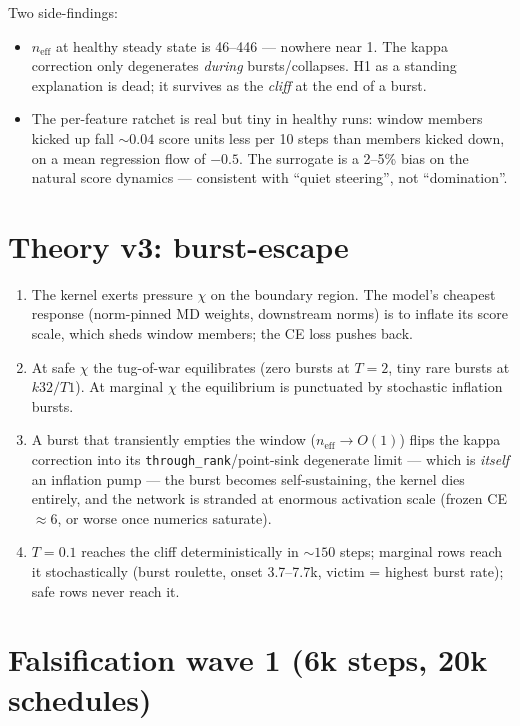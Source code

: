 \documentclass[11pt,a4paper]{article}
\newcommand{\code}[1]{\texttt{#1}}
\newcommand{\neff}{n_{\mathrm{eff}}}
\begin{document}
Two side-findings:
\begin{itemize}[leftmargin=1.4em]
\item $\neff$ at healthy steady state is 46--446 --- nowhere near 1. The kappa
  correction only degenerates \emph{during} bursts/collapses. H1 as a standing
  explanation is dead; it survives as the \emph{cliff} at the end of a burst.
\item The per-feature ratchet is real but tiny in healthy runs: window members
  kicked up fall ${\sim}0.04$ score units less per 10 steps than members
  kicked down, on a mean regression flow of $-0.5$. The surrogate is a
  2--5\% bias on the natural score dynamics --- consistent with ``quiet
  steering'', not ``domination''.
\end{itemize}

\section{Theory v3: burst-escape}

\begin{enumerate}[leftmargin=1.6em]
\item The kernel exerts pressure $\chi$ on the boundary region. The model's
  cheapest response (norm-pinned MD weights, downstream norms) is to inflate
  its score scale, which sheds window members; the CE loss pushes back.
\item At safe $\chi$ the tug-of-war equilibrates (zero bursts at $T{=}2$, tiny
  rare bursts at $k32/T1$). At marginal $\chi$ the equilibrium is punctuated
  by stochastic inflation bursts.
\item A burst that transiently empties the window ($\neff \to O(1)$) flips the
  kappa correction into its \code{through\_rank}/point-sink degenerate limit
  --- which is \emph{itself} an inflation pump --- the burst becomes
  self-sustaining, the kernel dies entirely, and the network is stranded at
  enormous activation scale (frozen CE $\approx 6$, or worse once numerics
  saturate).
\item $T{=}0.1$ reaches the cliff deterministically in ${\sim}150$ steps;
  marginal rows reach it stochastically (burst roulette, onset 3.7--7.7k,
  victim = highest burst rate); safe rows never reach it.
\end{enumerate}

\section{Falsification wave 1 (6k steps, 20k schedules)}
\end{document}
